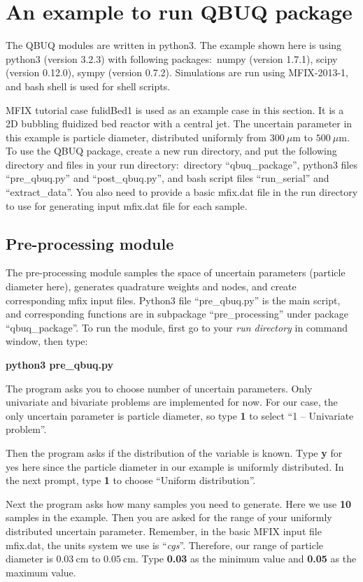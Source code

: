 \documentclass[a4paper,12pt,titlepage]{article}
\begin{document}
\section{An example to run QBUQ package}
\label{sec:ExampleQBUQ}
The QBUQ modules are written in python3. The example shown here is using
python3 (version 3.2.3) with following packages:\ numpy (version 1.7.1), scipy 
(version 0.12.0), sympy (version 0.7.2). Simulations are run using MFIX-2013-1, 
and bash shell is used for shell scripts.

MFIX tutorial case fulidBed1 is used as an example case in this section. It is 
a 2D bubbling fluidized bed reactor with a central jet. The uncertain parameter
in this example is particle diameter, distributed uniformly from 
$300\ \mu\textrm{m}$ to $500\ \mu\textrm{m}$. To use the QBUQ package, create a 
new run directory, and put the following directory and files in your run
directory:\ directory ``qbuq\_package'', python3 files ``pre\_qbuq.py'' and 
``post\_qbuq.py'', and bash script files ``run\_serial'' and ``extract\_data''. 
You also need to provide a basic mfix.dat file in the run directory to use 
for generating input mfix.dat file for each sample.

\subsection{Pre-processing module}
\label{sec:Pre-processing}
The pre-processing module samples the space of uncertain parameters (particle
diameter here), generates quadrature weights and nodes, and create corresponding
mfix input files. Python3 file ``pre\_qbuq.py'' is the main script, and 
corresponding functions are in subpackage ``pre\_processing'' under package 
``qbuq\_package''. To run the module, first go to your \emph{run directory} in 
command window, then type: 

\textbf{python3 pre\_qbuq.py}

The program asks you to choose number of uncertain parameters. Only univariate 
and bivariate problems are implemented for now. For our case, the only uncertain
parameter is particle diameter, so type \textbf{1} to select ``1 -- Univariate 
problem''.

Then the program asks if the distribution of the variable is known. Type 
\textbf{y} for yes here since the particle diameter in our example is uniformly
distributed. In the next prompt, type \textbf{1} to choose ``Uniform 
distribution''.

Next the program asks how many samples you need to generate. Here we use 
\textbf{10} samples in the example. Then you are asked for the range of your 
uniformly distributed uncertain parameter. Remember, in the basic MFIX input 
file mfix.dat, the units system we use is ``\emph{cgs}''. Therefore, our range 
of particle diameter is $0.03\ \textrm{cm}$ to $0.05\ \textrm{cm}$. Type 
\textbf{0.03} as the minimum value and \textbf{0.05} as the maximum value.
\end{document}
